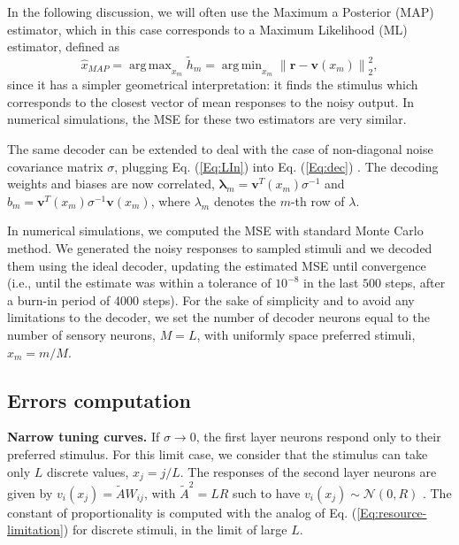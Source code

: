 \documentclass[a4paper]{article}%
\DeclareMathOperator*{\argmin}{arg\,min}
\DeclareMathOperator*{\argmax}{arg\,max}
\begin{document}
In the following discussion, we will often use the Maximum a Posterior (MAP)
estimator, which in this case corresponds to a Maximum Likelihood (ML) estimator, defined as
\begin{equation}
\hat{x}_{MAP} = \argmax_{x_{m}} \tilde h_{m} = \argmin_{x_{m}} \left\|  \mathbf{r} -
\mathbf{v} (x_{m})\right\|  _{2}^{2}, \label{Eq:ML}%
\end{equation}
since it has a simpler geometrical interpretation: it finds the stimulus which
corresponds to the closest vector of mean responses to the noisy output. In
numerical simulations, the MSE for these two estimators are very similar.

The same decoder can be extended to deal with the case of non-diagonal noise
covariance matrix $\sigma$, plugging Eq. (\ref{Eq:LIn}) into Eq.
(\ref{Eq:dec}) . The decoding weights and biases are now correlated,
$\mathbf{\lambda}_{m} = \mathbf{v}^{T}(x_{m} )\sigma^{-1}$ and $b_{m} =
\mathbf{v}^{T}(x_{m})\sigma^{-1}\mathbf{v}(x_{m})$, where $\lambda_{m}$
denotes the $m$-th row of $\lambda$.

In numerical simulations, we computed the MSE with standard Monte Carlo
method. We generated the noisy responses to sampled stimuli and we decoded
them using the ideal decoder, updating the estimated MSE until convergence (i.e., until the estimate was within a tolerance of $10^{-8}$ in the last $500$ steps, after a burn-in period of 4000 steps). For the sake of simplicity and to avoid any limitations to the decoder, we
set the number of decoder neurons equal to the number of sensory neurons,
$M=L$, with uniformly space preferred stimuli, $x_{m} = m/M$.
\newline

\subsection*{Errors computation}

\textbf{Narrow tuning curves.} If $\sigma\rightarrow0$, the first layer
neurons respond only to their preferred stimulus. For this limit case, we
consider that the stimulus can take only $L$ discrete values, $x_{j} = j/L$.
The responses of the second layer neurons are given by $v_{i}(x_{j}) =
\tilde{A}W_{ij}$, with $\tilde{A}^{2} = L R$ such to have $v_{i}(x_{j})
\sim\mathcal{N}(0,R)$ . The constant of proportionality is computed with the analog of Eq. (\ref{Eq:resource-limitation}) for discrete stimuli, in the limit of large $L$.
\end{document}
